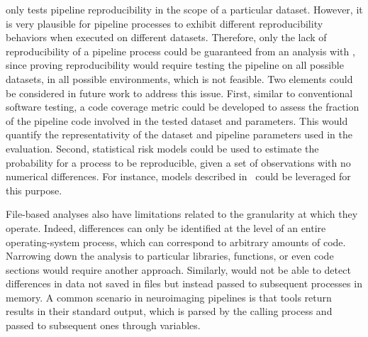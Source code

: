 \toolname only tests pipeline reproducibility in the scope of a particular dataset. However, it is very plausible 
for pipeline processes to exhibit different reproducibility behaviors when executed on different datasets. 
Therefore, only the lack of reproducibility of a pipeline process could be guaranteed from an analysis with \toolname, 
since proving reproducibility would require testing the pipeline on all possible datasets, in all possible environments, 
which is not feasible. Two elements could be considered in future work to address this issue. 
First, similar to conventional software testing, a code coverage metric could be developed to assess 
the fraction of the pipeline code involved in the tested dataset and parameters. This would quantify 
the representativity of the dataset and pipeline parameters used in the evaluation. Second, statistical 
risk models could be used to estimate the probability for a process to be reproducible, given a set of 
observations with no numerical differences. For instance, models described in~\cite{beauzamy2004methodes} 
could be leveraged for this purpose.

File-based analyses also have limitations related to the
granularity at which they operate. Indeed, differences can only be
identified at the level of an entire operating-system process, which can
correspond to arbitrary amounts of code. Narrowing down the analysis to
particular libraries, functions, or even code sections would require
another approach. Similarly, \toolname would not be able to detect
differences in data not saved in files but instead passed to subsequent processes
in memory. A common scenario in neuroimaging pipelines is that tools return
results in their standard output, which is parsed by the calling process
and passed to subsequent ones through variables.


